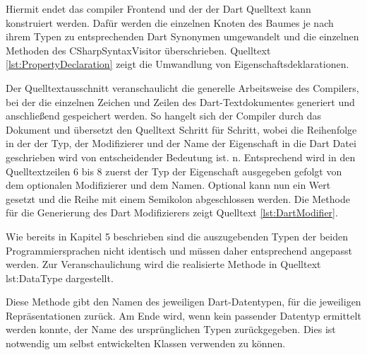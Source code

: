 Hiermit endet das compiler Frontend und der der Dart Quelltext kann konstruiert werden.  Dafür werden die einzelnen Knoten des Baumes je nach ihrem Typen zu entsprechenden Dart Synonymen umgewandelt und die einzelnen Methoden des \glq CSharpSyntaxVisitor\grq{} überschrieben.  Quelltext \ref{lst:PropertyDeclaration} zeigt die Umwandlung von Eigenschaftsdeklarationen.
\newpage


Der Quelltextausschnitt veranschaulicht die generelle Arbeitsweise des Compilers,  bei der die einzelnen Zeichen und Zeilen des Dart-Textdokumentes generiert und anschließend gespeichert werden.  So hangelt sich der Compiler durch das Dokument und übersetzt den Quelltext Schritt für Schritt, wobei die Reihenfolge in der der 
Typ, der Modifizierer und der Name der Eigenschaft in die Dart Datei geschrieben wird von entscheidender Bedeutung ist.
n.  Entsprechend wird in den Quelltextzeilen 6 bis 8 zuerst der Typ der Eigenschaft ausgegeben gefolgt von dem optionalen Modifizierer und dem Namen.   Optional kann nun ein Wert gesetzt und die Reihe mit einem Semikolon abgeschlossen werden.  Die Methode für die Generierung des Dart Modifizierers zeigt Quelltext \ref{lst:DartModifier}.




Wie bereits in Kapitel 5 beschrieben sind die auszugebenden Typen der beiden Programmiersprachen nicht identisch und müssen daher entsprechend angepasst werden.  Zur  Veranschaulichung wird die realisierte Methode in Quelltext {lst:DataType} dargestellt. 


Diese Methode gibt den Namen des jeweiligen Dart-Datentypen,  für die jeweiligen \Csharp Repräsentationen zurück.  Am Ende wird,  wenn kein passender Datentyp ermittelt werden konnte,  der Name des ursprünglichen Typen zurückgegeben.  Dies ist notwendig um selbst entwickelten Klassen verwenden zu können. 


